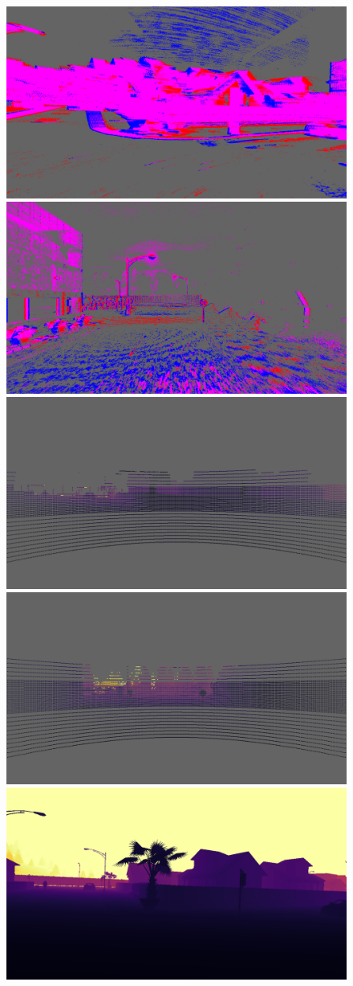 \begin{figure}
  \centering
  \includegraphics[width=0.475\linewidth]{mainmatter/figures/c_depth_transf/sled_dense_cmp_additional/data_and_gt/evts001630_lightgray_fixed.png}
  \includegraphics[width=0.475\linewidth]{mainmatter/figures/c_depth_transf/sled_dense_cmp_additional/data_and_gt/evts002216_lightgray_fixed.png}\\
  \includegraphics[width=0.475\linewidth]{mainmatter/figures/c_depth_transf/sled_dense_cmp_additional/data_and_gt/lidar001630_lightgray_fixed.png}
  \includegraphics[width=0.475\linewidth]{mainmatter/figures/c_depth_transf/sled_dense_cmp_additional/data_and_gt/lidar002216_lightgray_fixed.png}\\
  \includegraphics[width=0.475\linewidth]{mainmatter/figures/c_depth_transf/sled_dense_cmp_additional/data_and_gt/gtprev001630.png}

\end{figure}
